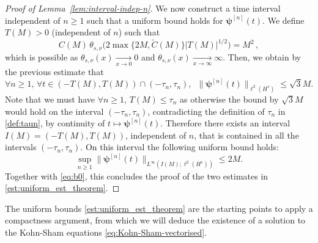 \documentclass[12pt,a4paper]{amsart}
\numberwithin{equation}{section}
\newcommand{\ulpsi}{\boldsymbol{\psi}}
\newcommand{\thetasnu}{\theta_{s,\nu}}
\begin{document}
\begin{proof}[Proof of Lemma~\ref{lem:interval-indep-n}]
		We now construct a time interval independent of $n \geq 1$ such that a uniform bound holds for $\ulpsi^{[n]}(t)$. We define $ T(M) > 0 $ (independent of $n$) such that
		\begin{equation}
			C(M) \,\thetasnu \big( 2 \max\{2M,\tilde{C}(M)\}  |T(M)|^{1/2}\big) = M^2 \,,
		\end{equation}
		which is possible as $\thetasnu (x)\xrightarrow[x\to0]{}0$ and $\thetasnu (x)\xrightarrow[x\to\infty]{}\infty$. 
		Then, we obtain by the previous estimate that
		\begin{equation}
			\forall n \geq 1, \, \forall t \in \left( -T(M), T(M) \right) \cap (-\tau_n, \tau_n), \;\ \| \ulpsi^{[n]}(t) \|_{\ell^2(H^{s})} \leq \sqrt{3}M .
		\end{equation} 
		Note that we must have $ \forall n \geq 1, \, T(M) \leq \tau_n $ as otherwise the bound by $\sqrt{3}M$ would hold on the interval $ (-\tau_n,\tau_n) $, contradicting the definition of $\tau_n$ in \eqref{def:taun}, by continuity of $t\mapsto \ulpsi^{[n]}(t)$. Therefore there exists an interval $ I(M) = \left( -T(M),T(M) \right) $, independent of $n$, that is contained in all the intervals $(-\tau_n,\tau_n)$. On this interval the following uniform bound holds:
		\begin{equation}
			\sup_{n \geq 1} \| \ulpsi^{[n]}(t) \|_{L^{\infty}(I(M);\ell^2(H^{s}))} \leq 2M .
		\end{equation}
		Together with \eqref{eq:b0}, this concludes the proof of the two  estimates in \eqref{est:uniform_est_theorem}.
	\end{proof}
	
	
	The uniform bounds \eqref{est:uniform_est_theorem} are the starting points to apply a compactness argument, from which we will deduce the existence of a solution to the Kohn-Sham equations \eqref{eq:Kohn-Sham-vectorised}. 
	
\end{document}
